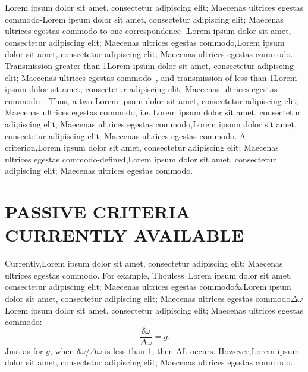 Lorem ipsum dolor sit amet, consectetur adipiscing elit; Maecenas ultrices egestas commodo-Lorem ipsum dolor sit amet, consectetur adipiscing elit; Maecenas ultrices egestas commodo-to-one correspondence~\cite{1994_Freilikher_absorption}.Lorem ipsum dolor sit amet, consectetur adipiscing elit; Maecenas ultrices egestas commodo,Lorem ipsum dolor sit amet, consectetur adipiscing elit; Maecenas ultrices egestas commodo. Transmission greater than 1Lorem ipsum dolor sit amet, consectetur adipiscing elit; Maecenas ultrices egestas commodo~\cite{2004_Yamilov_intensity,2006_Yamilov_conductance}, and transmission of less than 1Lorem ipsum dolor sit amet, consectetur adipiscing elit; Maecenas ultrices egestas commodo~\cite{2000_chabanov_nature,1998_Brouwer}. Thus, a two-Lorem ipsum dolor sit amet, consectetur adipiscing elit; Maecenas ultrices egestas commodo, i.e.,Lorem ipsum dolor sit amet, consectetur adipiscing elit; Maecenas ultrices egestas commodo,Lorem ipsum dolor sit amet, consectetur adipiscing elit; Maecenas ultrices egestas commodo. A criterion,Lorem ipsum dolor sit amet, consectetur adipiscing elit; Maecenas ultrices egestas commodo-defined,Lorem ipsum dolor sit amet, consectetur adipiscing elit; Maecenas ultrices egestas commodo. 

\section{PASSIVE CRITERIA CURRENTLY AVAILABLE}
\label{sec:passive_criteria}
Currently,Lorem ipsum dolor sit amet, consectetur adipiscing elit; Maecenas ultrices egestas commodo. For example, Thouless~\cite{1977_Thouless}Lorem ipsum dolor sit amet, consectetur adipiscing elit; Maecenas ultrices egestas commodo$\delta \omega$Lorem ipsum dolor sit amet, consectetur adipiscing elit; Maecenas ultrices egestas commodo$\Delta \omega$Lorem ipsum dolor sit amet, consectetur adipiscing elit; Maecenas ultrices egestas commodo:
\begin{equation}
\frac{\delta \omega}{\Delta \omega}= g.
\label{eq:Thouless_passive}
\end{equation}
Just as for $g$, when $\delta \omega/\Delta \omega$ is less than 1, then AL occurs. However,Lorem ipsum dolor sit amet, consectetur adipiscing elit; Maecenas ultrices egestas commodo.

